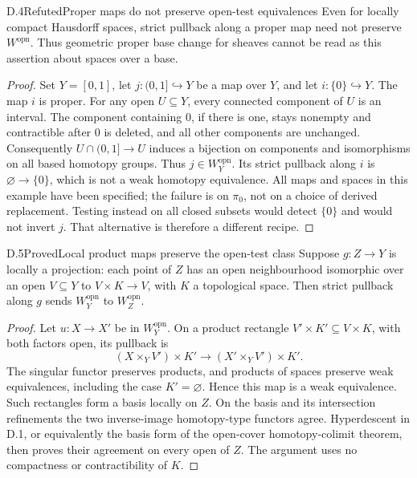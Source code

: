 \begin{claim}{D.4}{Refuted}{Proper maps do not preserve open-test equivalences}
Even for locally compact Hausdorff spaces, strict pullback along a
proper map need not preserve $W^{\mathrm{opn}}$. Thus geometric proper
base change for sheaves cannot be read as this assertion about spaces
over a base.
\end{claim}
\begin{proof}
Set $Y=[0,1]$, let $j:(0,1]\hookrightarrow Y$ be a map over $Y$, and
let $i:\{0\}\hookrightarrow Y$. The map $i$ is proper. For any open
$U\subseteq Y$, every connected component of $U$ is an interval. The
component containing $0$, if there is one, stays nonempty and
contractible after $0$ is deleted, and all other components are
unchanged. Consequently $U\cap(0,1]\to U$ induces a bijection on
components and isomorphisms on all based homotopy groups. Thus
$j\in W^{\mathrm{opn}}_Y$. Its strict pullback along $i$ is
$\varnothing\to\{0\}$, which is not a weak homotopy equivalence.
All maps and spaces in this example have been specified; the failure
is on $\pi_0$, not on a choice of derived replacement. Testing instead
on all closed subsets would detect $\{0\}$ and would not invert $j$.
That alternative is therefore a different recipe.
\end{proof}

\begin{claim}{D.5}{Proved}{Local product maps preserve the open-test class}
Suppose $g:Z\to Y$ is locally a projection: each point of $Z$ has an
open neighbourhood isomorphic over an open $V\subseteq Y$ to
$V\times K\to V$, with $K$ a topological space. Then strict pullback
along $g$ sends $W^{\mathrm{opn}}_Y$ to $W^{\mathrm{opn}}_Z$.
\end{claim}
\begin{proof}
Let $u:X\to X'$ be in $W^{\mathrm{opn}}_Y$. On a product rectangle
$V'\times K'\subseteq V\times K$, with both factors open, its
pullback is
\[
 (X\times_YV')\times K'\longrightarrow
 (X'\times_YV')\times K'.
\]
The singular functor preserves products, and products of spaces
preserve weak equivalences, including the case $K'=\varnothing$.
Hence this map is a weak equivalence. Such rectangles form a basis
locally on $Z$. On the basis and its intersection refinements the two
inverse-image homotopy-type functors agree. Hyperdescent in D.1, or
equivalently the basis form of the open-cover homotopy-colimit theorem,
then proves their agreement on every open of $Z$. The argument uses
no compactness or contractibility of $K$.
\end{proof}

